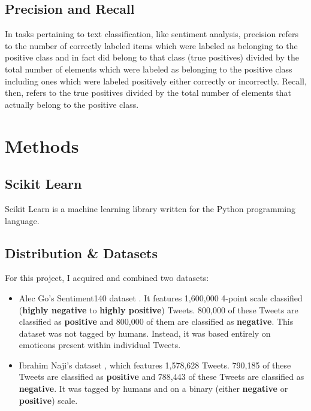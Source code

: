 \documentclass[11pt, twoside, reqno]{book}
\begin{document}
\section{Precision and Recall}
\label{secI6}

In tasks pertaining to text classification, like sentiment analysis, precision refers to the number of correctly labeled items which were labeled as belonging to the positive class and in fact did belong to that class (true positives) divided by the total number of elements which were labeled as belonging to the positive class including ones which were labeled positively either correctly or incorrectly. Recall, then, refers to the true positives divided by the total number of elements that actually belong to the positive class.

\chapter{Methods}
\label{chapM}

\section{Scikit Learn}
\label{secM1}

Scikit Learn is a machine learning library written for the Python programming language.

\section{Distribution \& Datasets}
\label{secM2}

For this project, I acquired and combined two datasets: 

\begin{itemize}

\item Alec Go's Sentiment140 dataset \cite{GODATASET}. It features 1,600,000 4-point scale classified (\textbf{highly negative} to \textbf{highly positive}) Tweets. 800,000 of these Tweets are classified as \textbf{positive} and 800,000 of them are classified as \textbf{negative}. This dataset was not tagged by humans. Instead, it was based entirely on emoticons present within individual Tweets. 

\item Ibrahim Naji's dataset \cite{NAJIDATASET}, which features 1,578,628 Tweets. 790,185 of these Tweets are classified as \textbf{positive} and 788,443 of these Tweets are classified as \textbf{negative}. It was tagged by humans and on a binary (either \textbf{negative} or \textbf{positive}) scale.

\end{itemize}
\end{document}
